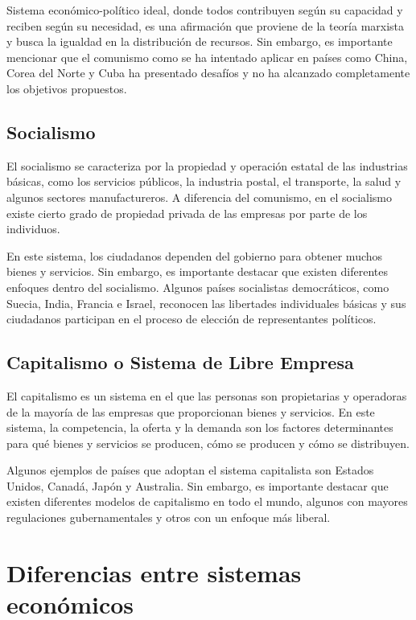 \documentclass[
  man,
  floatsintext,
  longtable,
  a4paper,
  nolmodern,
  notxfonts,
  notimes,
  colorlinks=true,linkcolor=blue,citecolor=blue,urlcolor=blue]{apa7}
\begin{document}
Sistema económico-político ideal, donde todos contribuyen según su
capacidad y reciben según su necesidad, es una afirmación que proviene
de la teoría marxista y busca la igualdad en la distribución de
recursos. Sin embargo, es importante mencionar que el comunismo como se
ha intentado aplicar en países como China, Corea del Norte y Cuba ha
presentado desafíos y no ha alcanzado completamente los objetivos
propuestos.

\subsection{Socialismo}\label{socialismo}

El socialismo se caracteriza por la propiedad y operación estatal de las
industrias básicas, como los servicios públicos, la industria postal, el
transporte, la salud y algunos sectores manufactureros. A diferencia del
comunismo, en el socialismo existe cierto grado de propiedad privada de
las empresas por parte de los individuos.

En este sistema, los ciudadanos dependen del gobierno para obtener
muchos bienes y servicios. Sin embargo, es importante destacar que
existen diferentes enfoques dentro del socialismo. Algunos países
socialistas democráticos, como Suecia, India, Francia e Israel,
reconocen las libertades individuales básicas y sus ciudadanos
participan en el proceso de elección de representantes políticos.

\subsection{Capitalismo o Sistema de Libre
Empresa}\label{capitalismo-o-sistema-de-libre-empresa}

El capitalismo es un sistema en el que las personas son propietarias y
operadoras de la mayoría de las empresas que proporcionan bienes y
servicios. En este sistema, la competencia, la oferta y la demanda son
los factores determinantes para qué bienes y servicios se producen, cómo
se producen y cómo se distribuyen.

Algunos ejemplos de países que adoptan el sistema capitalista son
Estados Unidos, Canadá, Japón y Australia. Sin embargo, es importante
destacar que existen diferentes modelos de capitalismo en todo el mundo,
algunos con mayores regulaciones gubernamentales y otros con un enfoque
más liberal.

\section{Diferencias entre sistemas
económicos}\label{diferencias-entre-sistemas-econuxf3micos}
\end{document}
